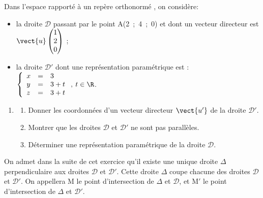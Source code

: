 \medskip

Dans l'espace rapporté à un repère orthonormé \Oijk, on considère:

\begin{itemize}
\item[$\bullet~~$] la droite $\mathcal{D}$ passant par le point A(2~;~4~;~0) et dont un vecteur directeur est $\vect{u}\begin{pmatrix}1\\2\\0\end{pmatrix}$ ;
\item[$\bullet~~$] la droite $\mathcal{D}'$ dont une représentation paramétrique est : $\left\{\begin{array}{l c l}
x&=&3\\
y&=& 3 + t\\
z&=&3 + t
\end{array}\right. ,\: t \in \R$.
\end{itemize}

\medskip

\begin{enumerate}
\item 

	\begin{enumerate}
		\item Donner les coordonnées d'un vecteur directeur $\vect{u'}$ de la droite $\mathcal{D}'$.
		\item Montrer que les droites $\mathcal{D}$ et $\mathcal{D}'$ ne sont pas parallèles.
		\item Déterminer une représentation paramétrique de la droite $\mathcal{D}$.
	\end{enumerate}
\end{enumerate}

On admet dans la suite de cet exercice qu'il existe une unique droite $\Delta$ perpendiculaire aux droites $\mathcal{D}$ et $\mathcal{D}'$. Cette droite $\Delta$ coupe chacune des droites $\mathcal{D}$ et $\mathcal{D}'$. On appellera M le point d'intersection de $\Delta$ et $\mathcal{D}$, et M$'$ le point d'intersection de $\Delta$ et $\mathcal{D}'$.

